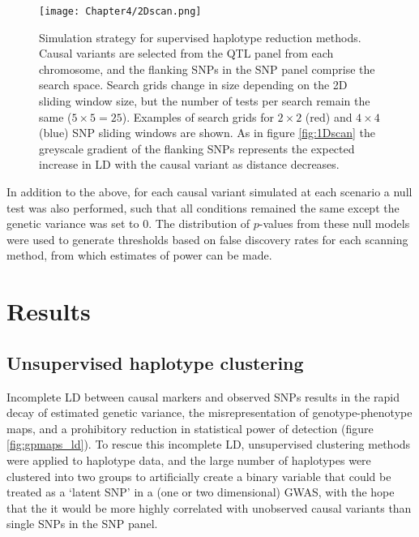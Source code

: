 \begin{figure}
\begin{center}
\texttt{[image: Chapter4/2Dscan.png]}
\caption[Simulation strategy 2D scans]{Simulation strategy for supervised haplotype reduction methods. Causal variants are selected from the QTL panel from each chromosome, and the flanking SNPs in the SNP panel comprise the search space. Search grids change in size depending on the 2D sliding window size, but the number of tests per search remain the same ($5 \times 5 = 25$). Examples of search grids for $2 \times 2$ (red) and $4 \times 4$ (blue) SNP sliding windows are shown. As in figure \ref{fig:1Dscan} the greyscale gradient of the flanking SNPs represents the expected increase in LD with the causal variant as distance decreases.}
\label{fig:2Dscan}
\end{center}
\end{figure}

In addition to the above, for each causal variant simulated at each scenario a null test was also performed, such that all conditions remained the same except the genetic variance was set to 0. The distribution of $p$-values from these null models were used to generate thresholds based on false discovery rates for each scanning method, from which estimates of power can be made.


\section{Results}

\subsection{Unsupervised haplotype clustering}
\label{sec:unsupervised_haplotype_clustering}

Incomplete LD between causal markers and observed SNPs results in the rapid decay of estimated genetic variance, the misrepresentation of genotype-phenotype maps, and a prohibitory reduction in statistical power of detection (figure \ref{fig:gpmaps_ld}). To rescue this incomplete LD, unsupervised clustering methods were applied to haplotype data, and the large number of haplotypes were clustered into two groups to artificially create a binary variable that could be treated as a `latent SNP' in a (one or two dimensional) GWAS, with the hope that the it would be more highly correlated with unobserved causal variants than single SNPs in the SNP panel.

